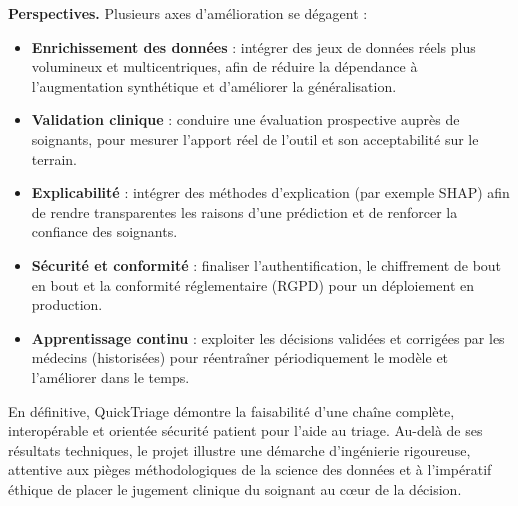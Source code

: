 \medskip
\noindent\textbf{Perspectives.} Plusieurs axes d'amélioration se dégagent :
\begin{itemize}
  \item \textbf{Enrichissement des données} : intégrer des jeux de données réels plus volumineux et
  multicentriques, afin de réduire la dépendance à l'augmentation synthétique et d'améliorer la
  généralisation.
  \item \textbf{Validation clinique} : conduire une évaluation prospective auprès de soignants, pour
  mesurer l'apport réel de l'outil et son acceptabilité sur le terrain.
  \item \textbf{Explicabilité} : intégrer des méthodes d'explication (par exemple SHAP) afin de
  rendre transparentes les raisons d'une prédiction et de renforcer la confiance des soignants.
  \item \textbf{Sécurité et conformité} : finaliser l'authentification, le chiffrement de bout en
  bout et la conformité réglementaire (RGPD) pour un déploiement en production.
  \item \textbf{Apprentissage continu} : exploiter les décisions validées et corrigées par les
  médecins (historisées) pour réentraîner périodiquement le modèle et l'améliorer dans le temps.
\end{itemize}

\medskip
\noindent En définitive, QuickTriage démontre la faisabilité d'une chaîne complète, interopérable et
orientée sécurité patient pour l'aide au triage. Au-delà de ses résultats techniques, le projet
illustre une démarche d'ingénierie rigoureuse, attentive aux pièges méthodologiques de la science des
données et à l'impératif éthique de placer le jugement clinique du soignant au cœur de la décision.
